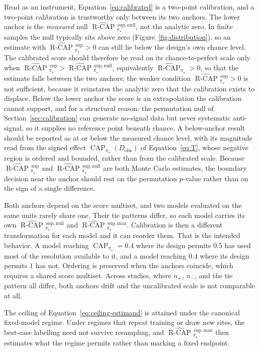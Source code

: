 \documentclass[11pt]{article}
\newcommand{\CAP}{\operatorname{CAP}}
\newcommand{\Tpi}{\CAP_{\pi_\star}}
\newcommand{\RCAPHat}{\widehat{\operatorname{R\text{-}CAP}}{}^{\,\mathrm{sup}}_{\pi_\star}}
\newcommand{\RCAPnullHat}{\widehat{\operatorname{R\text{-}CAP}}{}^{\,\mathrm{sup,null}}_{\pi_\star}}
\newcommand{\RCAPcalHat}{\widehat{\operatorname{R\text{-}CAP}}_{\pi_\star}}
\newcommand{\RCAPmaxHat}{\widehat{\operatorname{R\text{-}CAP}}{}^{\,\mathrm{sup,max}}_{\pi_\star}}
\theoremstyle{remark}
\begin{document}
Read as an instrument, Equation~\eqref{eq:calibrated} is a two-point calibration, and a two-point calibration is trustworthy only between its two anchors. The lower anchor is the \emph{measured} null $\RCAPnullHat$, not the analytic zero. In finite samples the null typically sits above zero (Figure~\ref{fig:distribution}), so an estimate with $\RCAPHat>0$ can still lie below the design's own chance level. The calibrated score should therefore be read on its chance-to-perfect scale only when $\RCAPHat>\RCAPnullHat$, equivalently $\RCAPcalHat>0$, so that the estimate falls between the two anchors; the weaker condition $\RCAPHat>0$ is not sufficient, because it reinstates the analytic zero that the calibration exists to displace. Below the lower anchor the score is an extrapolation the calibration cannot support, and for a structural reason: the permutation null of Section~\ref{sec:calibration} can generate no-signal data but never systematic anti-signal, so it supplies no reference point beneath chance. A below-anchor result should be reported as at or below the measured chance level, with its magnitude read from the signed effect $\Tpi(D_{\mathrm{obs}})$ of Equation~\eqref{eq:T}, whose negative region is ordered and bounded, rather than from the calibrated scale. Because $\RCAPHat$ and $\RCAPnullHat$ are both Monte Carlo estimates, the boundary decision near the anchor should rest on the permutation $p$-value rather than on the sign of a single difference.

Both anchors depend on the score multiset, and two models evaluated on the same units rarely share one. Their tie patterns differ, so each model carries its own $\RCAPnullHat$ and $\RCAPmaxHat$. Calibration is then a different transformation for each model and it can reorder them. That is the intended behavior. A model reaching $\Tpi=0.4$ where its design permits $0.5$ has used most of the resolution available to it, and a model reaching $0.4$ where its design permits $1$ has not. Ordering is preserved when the anchors coincide, which requires a shared score multiset. Across studies, where $n_+$, $n_-$, and the tie pattern all differ, both anchors drift and the uncalibrated scale is not comparable at all.

The ceiling of Equation~\eqref{eq:ceiling-estimand} is attained under the canonical fixed-model regime. Under regimes that repeat training or draw new sites, the best-case labelling need not survive resampling, and $\RCAPmaxHat$ then estimates what the regime permits rather than marking a fixed endpoint.
\end{document}
